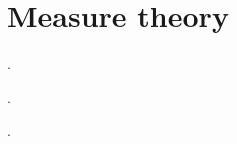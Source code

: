 \section{Measure theory}\label{sec:measure_theory}

\begin{definition}\label{def:sigma_algebra}
  .
\end{definition}

\begin{definition}\label{def:measure}
  .
\end{definition}

\begin{definition}\label{def:lebesgue_measure}
  .
\end{definition}
